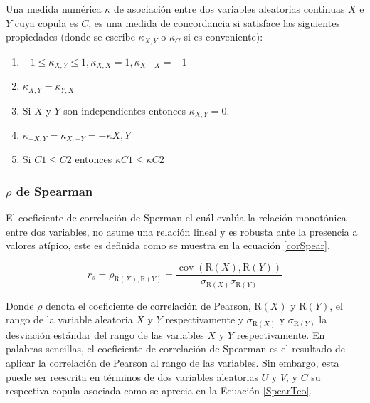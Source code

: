 \begin{defn}
    Una medida numérica $\kappa$ de asociación entre dos variables aleatorias continuas $X$ e $Y$ cuya copula es $C$, es una medida de concordancia si satisface las siguientes propiedades (donde se escribe $\kappa_{X,Y}$ o $\kappa_{C}$ si es conveniente):

    \begin{enumerate}
        \item $-1 \leq \kappa_{X,Y} \leq 1, \kappa_{X,X} = 1, \kappa_{X,-X} = -1$

        \item $\kappa_{X,Y} = \kappa_{Y,X}$

        \item Si $X$ y $Y$ son independientes entonces $\kappa_{X,Y} = 0$.

        \item $\kappa_{-X,Y} = \kappa_{X,-Y} = -\kappa X,Y$
        \item Si $C1 \leq C2$ entonces $\kappa C1 \leq \kappa C2$
    \end{enumerate}
\end{defn}
\subsubsection{$\rho$ de Spearman}

El coeficiente de correlación de Sperman el cuál evalúa la relación monotónica entre dos variables, no asume una relación lineal y es robusta ante la presencia a valores atípico, este es definida como se muestra en la ecuación \eqref{corSpear}.  

\begin{equation}\label{corSpear}
    r_s=\rho_{\mathrm{R}(X), \mathrm{R}(Y)}=\frac{\operatorname{cov}(\mathrm{R}(X), \mathrm{R}(Y))}{\sigma_{\mathrm{R}(X)} \sigma_{\mathrm{R}(Y)}}
\end{equation}

Donde $\rho$ denota el coeficiente de correlación de Pearson, $\mathrm{R}(X)$ y $\mathrm{R}(Y)$, el rango de la variable aleatoria $X$ y $Y$ respectivamente y $\sigma_{\mathrm{R}(X)}$ y $\sigma_{\mathrm{R}(Y)}$ la desviación estándar del rango de las variables $X$ y $Y$ respectivamente. En palabras sencillas, el coeficiente de correlación de Spearman es el resultado de aplicar la correlación de Pearson al rango de las variables. Sin embargo, esta puede ser reescrita en términos de dos variables aleatorias $U$ y $V$, y $C$ su respectiva copula asociada como se aprecia en la Ecuación \eqref{SpearTeo}.


